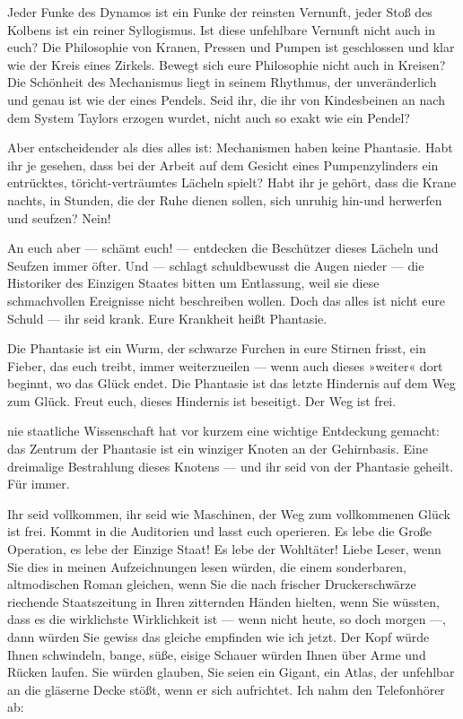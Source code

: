 Jeder Funke des Dynamos ist ein Funke der reinsten Vernunft, jeder
Stoß des Kolbens ist ein reiner Syllogismus. Ist diese unfehlbare
Vernunft nicht auch in euch? Die Philosophie von Kranen, Pressen
und Pumpen ist geschlossen und klar wie der Kreis eines Zirkels.
Bewegt sich eure Philosophie nicht auch in Kreisen? Die Schönheit
des Mechanismus liegt in seinem Rhythmus, der unveränderlich und
genau ist wie der eines Pendels. Seid ihr, die ihr von Kindesbeinen
an nach dem System Taylors erzogen wurdet, nicht auch so exakt wie
ein Pendel?

Aber entscheidender als dies alles ist: Mechanismen haben keine
Phantasie. Habt ihr je gesehen, dass bei der Arbeit auf dem Gesicht
eines Pumpenzylinders ein entrücktes, töricht-verträumtes Lächeln
spielt? Habt ihr je gehört, dass die Krane nachts, in Stunden, die
der Ruhe dienen sollen, sich unruhig hin-und herwerfen und seufzen?
Nein!

An euch aber — schämt euch! — entdecken die Beschützer dieses
Lächeln und Seufzen immer öfter. Und — schlagt schuldbewusst die
Augen nieder — die Historiker des Einzigen Staates bitten um
Entlassung, weil sie diese schmachvollen Ereignisse nicht
beschreiben wollen. Doch das alles ist nicht eure Schuld — ihr seid
krank. Eure Krankheit heißt Phantasie.

Die Phantasie ist ein Wurm, der schwarze Furchen in eure Stirnen
frisst, ein Fieber, das euch treibt, immer weiterzueilen — wenn
auch dieses »weiter« dort beginnt, wo das Glück endet. Die
Phantasie ist das letzte Hindernis auf dem Weg zum Glück. Freut
euch, dieses Hindernis ist beseitigt. Der Weg ist frei.

nie staatliche Wissenschaft hat vor kurzem eine wichtige Entdeckung
gemacht: das Zentrum der Phantasie ist ein winziger Knoten an der
Gehirnbasis. Eine dreimalige Bestrahlung dieses Knotens — und ihr
seid von der Phantasie geheilt. Für immer.

Ihr seid vollkommen, ihr seid wie Maschinen, der Weg zum
vollkommenen Glück ist frei. Kommt in die Auditorien und lasst euch
operieren. Es lebe die Große Operation, es lebe der Einzige Staat!
Es lebe der Wohltäter! Liebe Leser, wenn Sie dies in meinen
Aufzeichnungen lesen würden, die einem sonderbaren, altmodischen
Roman gleichen, wenn Sie die nach frischer Druckerschwärze
riechende Staatszeitung in Ihren zitternden Händen hielten, wenn
Sie wüssten, dass es die wirklichste Wirklichkeit ist — wenn nicht
heute, so doch morgen —, dann würden Sie gewiss das gleiche
empfinden wie ich jetzt. Der Kopf würde Ihnen schwindeln, bange,
süße, eisige Schauer würden Ihnen über Arme und Rücken laufen. Sie
würden glauben, Sie seien ein Gigant, ein Atlas, der unfehlbar an
die gläserne Decke stößt, wenn er sich aufrichtet. Ich nahm den
Telefonhörer ab:

